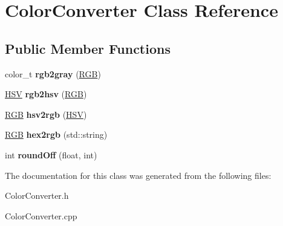\hypertarget{class_color_converter}{\section{Color\-Converter Class Reference}
\label{class_color_converter}
}
\subsection*{Public Member Functions}
\begin{DoxyCompactItemize}
\item 
\hypertarget{class_color_converter_aa9abd3937e87e0fcb712d2ca7a611402}{color\-\_\-t {\bfseries rgb2gray} (\hyperlink{struct_r_g_b}{R\-G\-B})}\label{class_color_converter_aa9abd3937e87e0fcb712d2ca7a611402}

\item 
\hypertarget{class_color_converter_a351341558ba62951aefd6d3d9bf09785}{\hyperlink{struct_h_s_v}{H\-S\-V} {\bfseries rgb2hsv} (\hyperlink{struct_r_g_b}{R\-G\-B})}\label{class_color_converter_a351341558ba62951aefd6d3d9bf09785}

\item 
\hypertarget{class_color_converter_aca4539e968906df8d1ecd102464a0372}{\hyperlink{struct_r_g_b}{R\-G\-B} {\bfseries hsv2rgb} (\hyperlink{struct_h_s_v}{H\-S\-V})}\label{class_color_converter_aca4539e968906df8d1ecd102464a0372}

\item 
\hypertarget{class_color_converter_a43a52a206fb9f246d31af8f7e39b4110}{\hyperlink{struct_r_g_b}{R\-G\-B} {\bfseries hex2rgb} (std\-::string)}\label{class_color_converter_a43a52a206fb9f246d31af8f7e39b4110}

\item 
\hypertarget{class_color_converter_adb9a22672900e507c63b172a14713e95}{int {\bfseries round\-Off} (float, int)}\label{class_color_converter_adb9a22672900e507c63b172a14713e95}

\end{DoxyCompactItemize}


The documentation for this class was generated from the following files\-:\begin{DoxyCompactItemize}
\item 
Color\-Converter.\-h\item 
Color\-Converter.\-cpp\end{DoxyCompactItemize}
